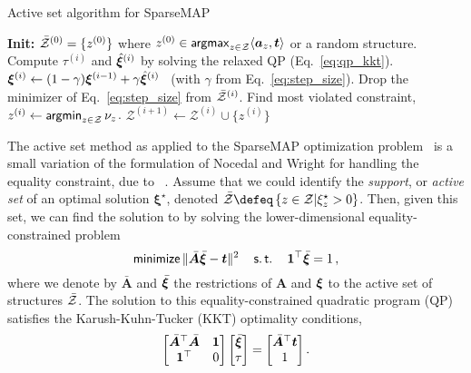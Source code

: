 \begin{algorithm}[htpb]
    \caption{Active set algorithm for SparseMAP \label{alg:activeset}}
    \begin{algorithmic}[1]
        \Statex \textbf{Init:}
        $\bar{\mathcal{Z}}^{(0)} = \{ z^{(0)}\}$
        \quad where \quad
        $z^{(0)} \in \operatorname*{\mathsf{argmax}}_{z \in \mathcal{Z}} \langle\bm{a}_z,\bm{t}\rangle$
        or a random structure.
        \State Compute $\tau^{(i)}$ and $\hat{\bm{\xi}}^{(i)}$ by solving the relaxed QP (Eq.~\ref{eq:qp_kkt}).
        \State $\bm{\xi}^{(i)} \gets (1-\gamma) \bm{\xi}^{(i-1)} + \gamma \hat{\bm{\xi}}^{(i)}$
        ~(with $\gamma$ from Eq.~\ref{eq:step_size}).
        \State Drop the minimizer of Eq.~\ref{eq:step_size} from $\bar{\mathcal{Z}}^{(i)}$.
        \Else
        \State Find most violated constraint,
        $z^{(i)} \gets \operatorname*{\mathsf{argmin}}_{z \in \mathcal{Z}} \nu_z$.
        \State \Return {}
        \Else
        \State $\mathcal{Z}^{(i+1)} \gets \mathcal{Z}^{(i)} \cup \{ z^{(i)} \}$
        \EndIf
        \EndIf
        \EndFor
    \end{algorithmic}
\end{algorithm}

The active set method
\citep[sections 16.4 \& 16.5]{nocedalwright} as applied to the SparseMAP
optimization problem~\citep[;][]{sparsemap}
is a small variation of the formulation of Nocedal and Wright for handling
the equality constraint, due to ~\citet[Section 6]{ad3}.
Assume that we could identify the \emph{support}, or
\emph{active set} of an optimal solution  $\bm{\xi}^\star$, denoted
$\bar\ZZ \defeq \left\{z \in \ZZ |\xi^\star_z > 0\right\}$.
Then, given this set, we can find the solution to 
by solving the lower-dimensional equality-constrained problem
%
\begin{equation}
    \operatorname*{\mathsf{minimize}}\| \bar{\bm{A}}\bar{\bm{\xi}} - \bm{t} \|^2
    \quad\operatorname*{\mathsf{s.t.}}\quad\bm{1}^\top\bar{\bm{\xi}} = 1\,,
\end{equation}
%
where we denote by $\bar{\bm{A}}$ and $\bar{\bm{\xi}}$ the restrictions of $\bm{A}$
and $\bm{\xi}$ to the active set of structures $\bar{\mathcal{Z}}$.
The solution to this equality-constrained quadratic program (QP) satisfies the Karush-Kuhn-Tucker (KKT) optimality
conditions,
%
\begin{equation}
    \label{eq:qp_kkt}
    \begin{bmatrix}
        {\bar{\bm{A}}}^\top \bar{\bm{A}} & \bm{1} \\
        \bm{1}^\top                      & 0      \\
    \end{bmatrix}
    \begin{bmatrix} \bar{\bm{\xi}} \\ \tau \end{bmatrix}
    =
    \begin{bmatrix} \bar{\bm{A}}^\top \bm{t} \\ 1 \end{bmatrix}.
\end{equation}

